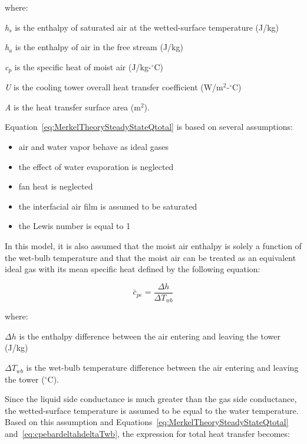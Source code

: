where:

\emph{h\(_{s}\)} is the enthalpy of saturated air at the wetted-surface temperature (J/kg)

\emph{h\(_{a}\)} is the enthalpy of air in the free stream (J/kg)

\emph{c\(_{p}\)} is the specific heat of moist air (J/kg-\(^{\circ}\)C)

\emph{U} is the cooling tower overall heat transfer coefficient (W/m\(^{2}\)-\(^{\circ}\)C)

\emph{A} is the heat transfer surface area (m\(^{2}\)).

Equation~\ref{eq:MerkelTheorySteadyStateQtotal} is based on several assumptions:

\begin{itemize}
\item air and water vapor behave as ideal gases

\item the effect of water evaporation is neglected

\item fan heat is neglected

\item the interfacial air film is assumed to be saturated

\item the Lewis number is equal to 1

\end{itemize}

In this model, it is also assumed that the moist air enthalpy is solely a function of the wet-bulb temperature and that the moist air can be treated as an equivalent ideal gas with its mean specific heat defined by the following equation:

\begin{equation}
\bar c_{pe} = \frac{{\Delta h}}{{\Delta {T_{wb}}}}
\label{eq:cpebardeltahdeltaTwb}
\end{equation}

where:

\(\Delta h\) is the enthalpy difference between the air entering and leaving the tower (J/kg)

\(\Delta T_{wb}\) is the wet-bulb temperature difference between the air entering and leaving the tower (\(^{\circ}\)C).

Since the liquid side conductance is much greater than the gas side conductance, the wetted-surface temperature is assumed to be equal to the water temperature. Based on this assumption and Equations~\ref{eq:MerkelTheorySteadyStateQtotal} and~\ref{eq:cpebardeltahdeltaTwb}, the expression for total heat transfer becomes:


